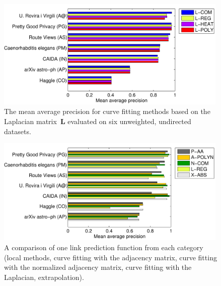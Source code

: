 \documentclass[11pt,a4paper]{book}
\newcommand{\wFull}{0.99}
\begin{document}
\begin{figure}[h!]
  \centering
  \includegraphics[width=\wFull\textwidth]{img-eps/resultsbar-base_l}
  \caption{
    The mean average precision for curve fitting methods based on the
    Laplacian matrix~$\mathbf L$ evaluated on six unweighted, undirected
    datasets. 
  }
  \label{fig:results-base-l}
\end{figure}

\begin{figure}[h!]
  \centering
  \includegraphics[width=\wFull\textwidth]{img-eps/resultsbar-base_best}
  \caption{
    A comparison of one link prediction function from each category
    (local methods, curve fitting with the adjacency matrix, curve
    fitting with the normalized adjacency matrix, curve fitting with the
    Laplacian, extrapolation). 
  }
  \label{fig:results-base-best}
\end{figure}
\end{document}
